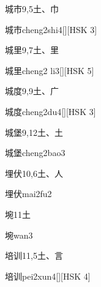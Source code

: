 \begin{entry}{城市}{9,5}{⼟、⼱}
  \begin{phonetics}{城市}{cheng2shi4}[][HSK 3]
  \end{phonetics}
\end{entry}

\begin{entry}{城里}{9,7}{⼟、⾥}
  \begin{phonetics}{城里}{cheng2 li3}[][HSK 5]
  \end{phonetics}
\end{entry}

\begin{entry}{城度}{9,9}{⼟、⼴}
  \begin{phonetics}{城度}{cheng2du4}[][HSK 3]
  \end{phonetics}
\end{entry}

\begin{entry}{城堡}{9,12}{⼟、⼟}
  \begin{phonetics}{城堡}{cheng2bao3}
  \end{phonetics}
\end{entry}

\begin{entry}{埋伏}{10,6}{⼟、⼈}
  \begin{phonetics}{埋伏}{mai2fu2}
  \end{phonetics}
\end{entry}

\begin{entry}{埦}{11}{⼟}
  \begin{phonetics}{埦}{wan3}
  \end{phonetics}
\end{entry}

\begin{entry}{培训}{11,5}{⼟、⾔}
  \begin{phonetics}{培训}{pei2xun4}[][HSK 4]
  \end{phonetics}
\end{entry}

